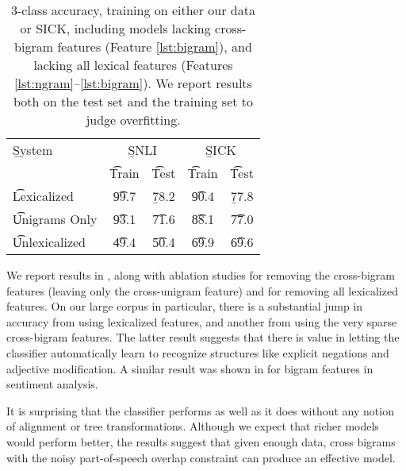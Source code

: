 \begin{table}
\begin{center}
\begin{tabular}{l@{\hskip \colspaceL}c@{\hskip \colspaceS}c@{\hskip \colspaceL}c@{\hskip \colspaceS}c}
\toprule
\b{System}	 & \multicolumn{2}{c}{\hspace{-1.2em}\b{SNLI}} & \multicolumn{2}{c}{\b{SICK}}\\
 & \t{Train} & \t{Test} & \t{Train} & \t{Test}\\
\midrule
\t{Lexicalized}            & \t{99.7}  & \b{78.2} & \t{90.4} & \b{77.8} \\ %
\t{Unigrams Only}          & \t{93.1} & \t{71.6}  & \t{88.1} & \t{77.0} \\ %
\t{Unlexicalized}          & \t{49.4} & \t{50.4}  & \t{69.9} & \t{69.6} \\ %
\bottomrule
\end{tabular}
\end{center}
\caption{
\label{tab:bowresults}
3-class accuracy, training on either our data or SICK, including models lacking cross-bigram features 
  (Feature \ref{lst:bigram}), and lacking all lexical
  features (Features \ref{lst:ngram}--\ref{lst:bigram}).
We report results both on the test set and the training set to judge overfitting.
}
\end{table}
%
%


We report results in , along with ablation studies for removing
  the cross-bigram features (leaving only the cross-unigram feature)
  and for removing all lexicalized features.
On our large corpus in particular, there is a substantial jump in accuracy from using
  lexicalized features, and another from using the very sparse
  cross-bigram features.
The latter  result suggests that there is value in letting
  the classifier automatically learn to recognize structures like explicit negations and adjective
  modification. A similar result was shown in
   for bigram features in sentiment analysis.
  
It is surprising that the classifier performs as well as it
  does without any notion of alignment or tree transformations.
Although we expect that richer models would perform better,
  the results suggest that given enough data, cross bigrams with the noisy 
  part-of-speech overlap constraint can produce an effective model.


